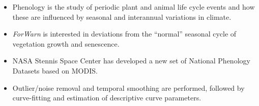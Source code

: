 \begin{frame}
 \vskip-0.10in
 \begin{columns}[c]
  \begin{itemize}
   \item {\color{blue}Phenology} is the study of periodic plant and animal life cycle events and how these are influenced by seasonal and interannual variations in climate.
   \item \textit{ForWarn} is interested in deviations from the ``normal'' seasonal cycle of vegetation growth and senescence.
   \item NASA Stennis Space Center has developed a new set of National Phenology Datasets based on MODIS.
   \item Outlier/noise removal and temporal smoothing are performed, followed by curve-fitting and estimation of descriptive curve parameters.
  \end{itemize}


\end{columns}
\end{frame}

